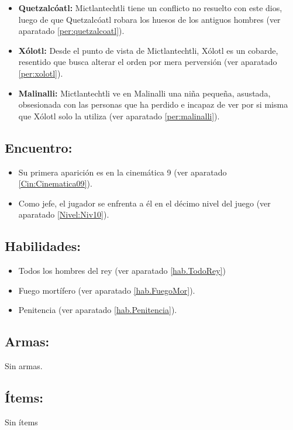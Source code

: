 \begin{itemize}
\begin{itemize}
		\item \textbf{Quetzalcóatl:}  Mictlantechtli tiene un conflicto no resuelto con este dios, luego de que Quetzalcóatl robara los huesos de los antiguos hombres (ver aparatado \ref{per:quetzalcoatl}).
		
		\item \textbf{Xólotl:}  Desde el punto de vista de Mictlantechtli, Xólotl es un cobarde, resentido que busca alterar el orden por mera perversión (ver aparatado \ref{per:xolotl}).
		
		\item \textbf{Malinalli:}  Mictlantechtli ve en Malinalli una niña pequeña, asustada, obsesionada con las personas que ha perdido e incapaz de ver por si misma que Xólotl solo la utiliza (ver aparatado \ref{per:malinalli}). 
	\end{itemize}                     
\end{itemize}

\subsection{Encuentro:}
\begin{itemize}
	\item Su primera aparición es en la cinemática 9 (ver aparatado \ref{Cin:Cinematica09}).
	\item Como jefe, el jugador se enfrenta a él en el décimo nivel del juego (ver aparatado \ref{Nivel:Niv10}).
\end{itemize} 

\subsection{Habilidades:}
\begin{itemize}
	\item Todos los hombres del rey (ver aparatado \ref{hab.TodoRey})
	\item Fuego mortífero (ver aparatado \ref{hab.FuegoMor}).
	\item Penitencia (ver aparatado \ref{hab.Penitencia}).
\end{itemize}  
\subsection{Armas:}
Sin armas.
\subsection{Ítems:}
Sin ítems
